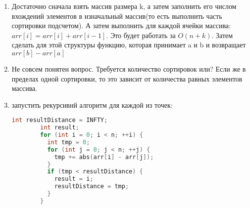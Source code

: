 \documentclass{article}
\begin{document}
\begin{enumerate}
    \item Достаточно сначала взять массив размера k, а затем заполнить его числом вхождений элементов в изначальный массив(то есть выполнить часть сортировки подсчетом). А затем выполнить для каждой ячейки массива: $arr[i] = arr[i] + arr[i-1]$. Это будет работать за $O(n+k)$. Затем сделать для этой структуры функцию, которая принимает a и b и возвращает $arr[b] - arr[a]$
    \item Не совсем понятен вопрос. Требуется количество сортировок или? Если же в пределах одной сортировки, то это зависит от количества равных элементов массива.
    \item запустить рекурсивнй алгоритм для каждой из точек:
      \begin{lstlisting}[language=c++]
        int resultDistance = INFTY;
        int result;
        for (int i = 0; i < n; ++i) {
          int tmp = 0;
          for (int j = 0; j < n; ++j) {
            tmp += abs(arr[i] - arr[j]);
          }
          if (tmp < resultDistance) {
            result = i;
            resultDistance = tmp;
          }
        }
      \end{lstlisting}
\end{enumerate}
\end{document}
